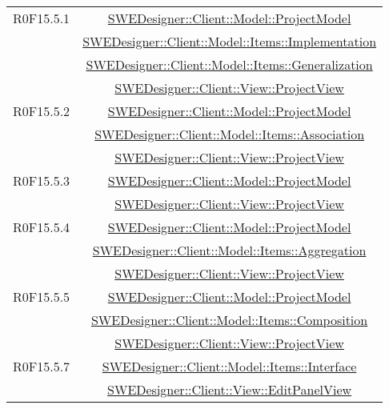 \documentclass[../DefinizioneDiProdotto.tex]{subfiles}
\begin{document}
\begin{longtable}{|c|c|}
				R0F15.5.1
				& \hyperlink{SWEDesigner::Client::Model::ProjectModel}{SWEDesigner::Client::Model::ProjectModel}\\
				& \hyperlink{SWEDesigner::Client::Model::Items::Implementation}{SWEDesigner::Client::Model::Items::Implementation}\\
				& \hyperlink{SWEDesigner::Client::Model::Items::Generalization}{SWEDesigner::Client::Model::Items::Generalization}\\
				& \hyperlink{SWEDesigner::Client::View::ProjectView}{SWEDesigner::Client::View::ProjectView}\\
				\hline

				R0F15.5.2
				& \hyperlink{SWEDesigner::Client::Model::ProjectModel}{SWEDesigner::Client::Model::ProjectModel}\\
				& \hyperlink{SWEDesigner::Client::Model::Items::Association}{SWEDesigner::Client::Model::Items::Association}\\
				& \hyperlink{SWEDesigner::Client::View::ProjectView}{SWEDesigner::Client::View::ProjectView}\\
				\hline

				R0F15.5.3
				& \hyperlink{SWEDesigner::Client::Model::ProjectModel}{SWEDesigner::Client::Model::ProjectModel}\\
				& \hyperlink{SWEDesigner::Client::View::ProjectView}{SWEDesigner::Client::View::ProjectView}\\
				\hline

				R0F15.5.4
				& \hyperlink{SWEDesigner::Client::Model::ProjectModel}{SWEDesigner::Client::Model::ProjectModel}\\
				& \hyperlink{SWEDesigner::Client::Model::Items::Aggregation}{SWEDesigner::Client::Model::Items::Aggregation}\\
				& \hyperlink{SWEDesigner::Client::View::ProjectView}{SWEDesigner::Client::View::ProjectView}\\
				\hline

				R0F15.5.5
				& \hyperlink{SWEDesigner::Client::Model::ProjectModel}{SWEDesigner::Client::Model::ProjectModel}\\
				& \hyperlink{SWEDesigner::Client::Model::Items::Composition}{SWEDesigner::Client::Model::Items::Composition}\\
				& \hyperlink{SWEDesigner::Client::View::ProjectView}{SWEDesigner::Client::View::ProjectView}\\
				\hline

				R0F15.5.7
				& \hyperlink{SWEDesigner::Client::Model::Items::Interface}{SWEDesigner::Client::Model::Items::Interface}\\
				& \hyperlink{SWEDesigner::Client::View::EditPanelView}{SWEDesigner::Client::View::EditPanelView}\\
				\hline


\end{longtable}
\end{document}

